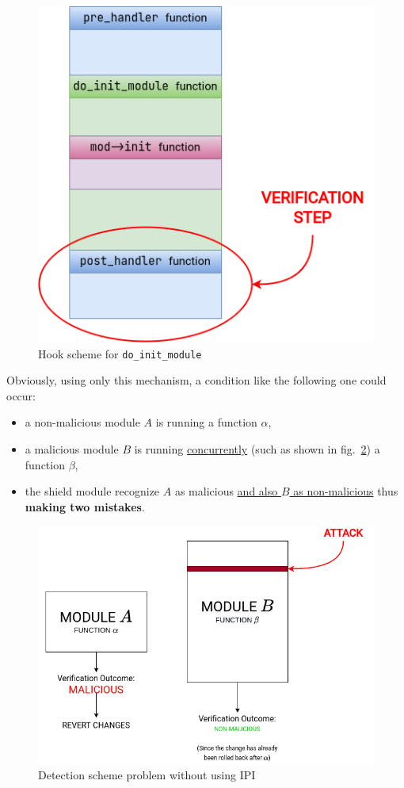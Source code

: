 \documentclass{article}
\begin{document}
	\begin{figure}[!htbp]
		\centering
		\includegraphics[scale=0.4]{monitoring}
		\caption{Hook scheme for \texttt{do\_init\_module}}
		\label{fig:monitoring}
	\end{figure}

	Obviously, using only this mechanism, a condition like the following one could occur:
	\begin{itemize}
		\item a non-malicious module $A$ is running a function $\alpha$,
		\item a malicious module $B$ is running \ul{concurrently} (such as shown in fig.~\ref{fig:concurrency}) a
		function $\beta$,
		\item the shield module recognize $A$ as malicious \ul{and also $B$ as non-malicious} thus \textbf{making two mistakes}.
	\end{itemize}

	\begin{figure}[!htbp]
		\centering
		\includegraphics[scale=0.4]{concurrency}
		\caption{Detection scheme problem without using IPI}
		\label{fig:concurrency}
	\end{figure}
\end{document}
